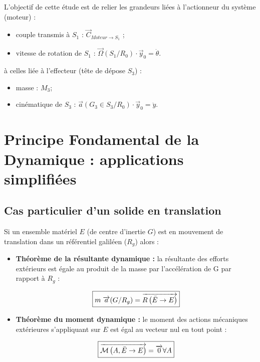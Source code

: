 \documentclass[10pt,fleqn]{article} %
\begin{document}
\begin{obj}
L'objectif de cette étude est de relier les grandeurs liées à l'actionneur du système (moteur) :
\begin{itemize}
\item couple transmis à $S_1$ : $\overrightarrow{C}_{Moteur\to S_1}$ ;
\item vitesse de rotation de $S_1$ : $\overrightarrow{\Omega}(S_1/R_0)\cdot \overrightarrow{y}_0=\dot{\theta}$.
\end{itemize} 
à celles liée à l'effecteur (tête de dépose $S_3$) : 
\begin{itemize}
\item masse : $M_3$;
\item cinématique de $S_3$ : $\overrightarrow{a}(G_3\in S_3/R_0)\cdot \overrightarrow{y}_0=\ddot{y}$.
\end{itemize}
\end{obj}



\section{Principe Fondamental de la Dynamique : applications simplifiées}

\subsection{Cas particulier d'un solide en translation}

\begin{definition}
Si un ensemble matériel $E$ (de centre d'inertie $G$) est en mouvement de translation dans un référentiel galiléen ($R_g$) alors : 

\begin{itemize}
\item \textbf{Théorème de la résultante dynamique : } la résultante des efforts extérieurs est égale au produit de la masse par l'accélération de G par rapport à $R_g$ :

\begin{align}
\boxed{
m\;\overrightarrow{a}(G/R_g)=\vectf{\bar E}{E}%
}
\end{align}

\item \textbf{Théorème du moment dynamique : } le moment des actions mécaniques extérieures s'appliquant sur $E$ est égal au vecteur nul en tout point :

\begin{align}
\boxed{
\overrightarrow{\mathcal{M}\left( {A}, {\bar E} \rightarrow {E}\right)}=\overrightarrow{0}\forall A
}
\end{align}
\end{itemize}

\end{definition}
\end{document}
